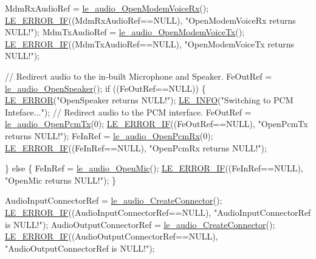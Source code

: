 \begin{DoxyCodeInclude}
    MdmRxAudioRef = \hyperlink{le__audio__interface_8h_ae3ed568ba4d2763ea77e17e77b20ff02}{le\_audio\_OpenModemVoiceRx}();
    \hyperlink{le__log_8h_aceaf11a11691d6c676e36dd317b38dbd}{LE\_ERROR\_IF}((MdmRxAudioRef==NULL), \textcolor{stringliteral}{"OpenModemVoiceRx returns NULL!"});
    MdmTxAudioRef = \hyperlink{le__audio__interface_8h_ad745f008bb04873c817da7af3daf783d}{le\_audio\_OpenModemVoiceTx}();
    \hyperlink{le__log_8h_aceaf11a11691d6c676e36dd317b38dbd}{LE\_ERROR\_IF}((MdmTxAudioRef==NULL), \textcolor{stringliteral}{"OpenModemVoiceTx returns NULL!"});

    \textcolor{comment}{// Redirect audio to the in-built Microphone and Speaker.}
    FeOutRef = \hyperlink{le__audio__interface_8h_a5c19afce44021c4abf6193707317f8de}{le\_audio\_OpenSpeaker}();
    \textcolor{keywordflow}{if} ((FeOutRef==NULL))
    \{
        \hyperlink{le__log_8h_a353590f91b3143a7ba3a416ae5a50c3d}{LE\_ERROR}(\textcolor{stringliteral}{"OpenSpeaker returns NULL!"});
        \hyperlink{le__log_8h_a23e6d206faa64f612045d688cdde5808}{LE\_INFO}(\textcolor{stringliteral}{"Switching to PCM Inteface..."});
        \textcolor{comment}{// Redirect audio to the PCM interface.}
        FeOutRef = \hyperlink{le__audio__interface_8h_a5e112543e8525775aa670dc71b320766}{le\_audio\_OpenPcmTx}(0);
        \hyperlink{le__log_8h_aceaf11a11691d6c676e36dd317b38dbd}{LE\_ERROR\_IF}((FeOutRef==NULL), \textcolor{stringliteral}{"OpenPcmTx returns NULL!"});
        FeInRef = \hyperlink{le__audio__interface_8h_aa0f0b5fcab8844c67a936d88fa050cf5}{le\_audio\_OpenPcmRx}(0);
        \hyperlink{le__log_8h_aceaf11a11691d6c676e36dd317b38dbd}{LE\_ERROR\_IF}((FeInRef==NULL), \textcolor{stringliteral}{"OpenPcmRx returns NULL!"});

    \}
    \textcolor{keywordflow}{else}
    \{
        FeInRef = \hyperlink{le__audio__interface_8h_a74f1ef979329f6c2bd56ea622f4d05b2}{le\_audio\_OpenMic}();
        \hyperlink{le__log_8h_aceaf11a11691d6c676e36dd317b38dbd}{LE\_ERROR\_IF}((FeInRef==NULL), \textcolor{stringliteral}{"OpenMic returns NULL!"});
    \}

    AudioInputConnectorRef = \hyperlink{le__audio__interface_8h_a570aaf85086f00aca592acfbaaa237be}{le\_audio\_CreateConnector}();
    \hyperlink{le__log_8h_aceaf11a11691d6c676e36dd317b38dbd}{LE\_ERROR\_IF}((AudioInputConnectorRef==NULL), \textcolor{stringliteral}{"AudioInputConnectorRef is NULL!"});
    AudioOutputConnectorRef = \hyperlink{le__audio__interface_8h_a570aaf85086f00aca592acfbaaa237be}{le\_audio\_CreateConnector}();
    \hyperlink{le__log_8h_aceaf11a11691d6c676e36dd317b38dbd}{LE\_ERROR\_IF}((AudioOutputConnectorRef==NULL), \textcolor{stringliteral}{"AudioOutputConnectorRef is NULL!"});


\end{DoxyCodeInclude}
